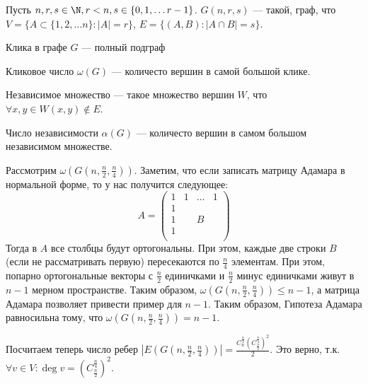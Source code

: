 
\begin{definition}
    Пусть \(n, r, s \in \N, r < n, s \in \{0, 1, \dots r- 1\}\). \(G(n, r, s)\) --- такой, граф, что \(V = \{A \subset \{1, 2, \dots n\}: |A| = r\}\), \(E = \{(A, B) : |A \cap B| = s\}\).
\end{definition}

\begin{definition}
    Клика в графе \(G\) --- полный подграф
\end{definition}
\begin{definition}
    Кликовое число \(\omega(G)\) --- количесто вершин в самой большой клике.
\end{definition}
\begin{definition}
    Независимое множество --- такое множество вершин \(W\), что \(\forall x, y \in W (x, y) \notin E\).
\end{definition}
\begin{definition}
    Число независимости \(\alpha(G)\) --- количесто вершин в самом большом независимом множестве.
\end{definition}


Рассмотрим \(\omega\left(G\left(n, \frac{n}{2}, \frac{n}{4}\right)\right)\). Заметим, что если записать матрицу Адамара в нормальной форме, то у нас получится следующее:
\[A = \left(\begin{array}{cccc}
    1 & 1 & \dots & 1 \\
    1 & & & \\
    1 & & B & \\
    1 & & & \\
\end{array}\right)\]
Тогда в \(A\) все столбцы будут ортогональны. При этом, каждые две строки \(B\) (если не рассматривать первую) пересекаются по \(\frac{n}{4}\) элементам. При этом, попарно ортогональные векторы с \(\frac{n}{2}\) единичками и \(\frac{n}{2}\) минус единичками живут в \(n - 1\) мерном пространстве. Таким образом, \(\omega\left(G\left(n, \frac{n}{2}, \frac{n}{4}\right)\right) \le n - 1\), а матрица Адамара позволяет привести пример для \(n - 1\). Таким образом, Гипотеза Адамара равносильна тому, что \(\omega\left(G\left(n, \frac{n}{2}, \frac{n}{4}\right)\right) = n - 1\).

Посчитаем теперь число ребер \(\left|E\left(G\left(n, \frac{n}{2}, \frac{n}{4}\right)\right)\right| = \frac{C_n^{\frac{n}{2}}\left(C_{\frac{n}{2}}^{\frac{n}{4}}\right)^2}{2}\). Это верно, т.к. \(\forall v \in V: \deg v = \left(C_{\frac{n}{2}}^{\frac{n}{4}}\right)^2\).

